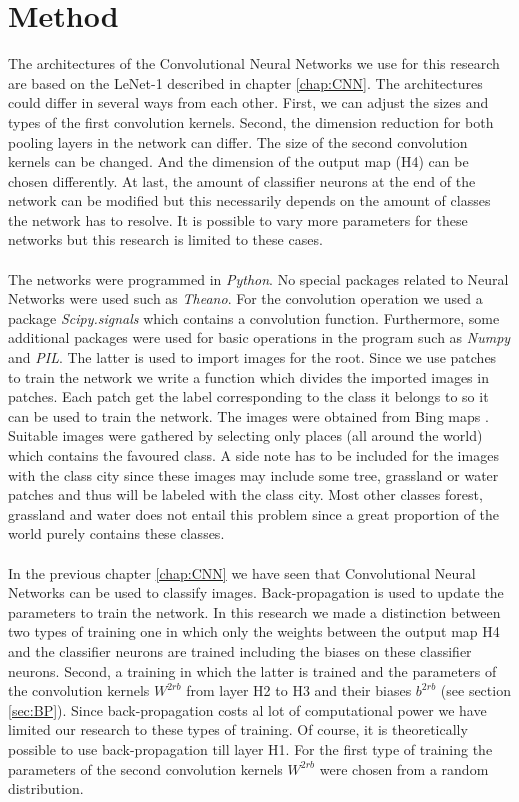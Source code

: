 \documentclass[a4paper,onecolumn]{report}
\begin{document}
\chapter{Method}
\label{chap:method}
The architectures of the Convolutional Neural Networks we use for this research are based on the LeNet-1 described in chapter \ref{chap:CNN}. The architectures could differ in several ways from each other. First, we can adjust the sizes and types of the first convolution kernels. Second, the dimension reduction for both pooling layers in the network can differ. The size of the second convolution kernels can be changed. And the dimension of the output map (H4) can be chosen differently. At last, the amount of classifier neurons at the end of the network can be modified but this necessarily depends on the amount of classes the network has to resolve.  It is possible to vary more parameters for these networks but this research is limited to these cases.
\\\\
The networks were programmed in \textit{Python}. No special packages related to Neural Networks were used such as \textit{Theano}. For the convolution operation we used a package \textit{Scipy.signals} which contains a convolution function. Furthermore, some additional packages were used for basic operations in the program such as \textit{Numpy} and \textit{PIL}. The latter is used to import images for the root. Since we use patches to train the network we write a function which divides the imported images in patches. Each patch get the label corresponding to the class it belongs to so it can be used to train the network. The images were obtained from Bing maps \cite{bing}. Suitable images were gathered by selecting only places (all around the world) which contains the favoured class. A side note has to be included for the images with the class city since these images may include some tree, grassland or water patches and thus will be labeled with the class city. Most other classes forest, grassland and water does not entail this problem since a great proportion of the world purely contains these classes.
\\\\
In the previous chapter \ref{chap:CNN} we have seen that Convolutional Neural Networks can be used to classify images. Back-propagation is used to update the parameters to train the network. In this research we made a distinction between two types of training one in which only the weights between the output map H4 and the classifier neurons are trained including the biases on these classifier neurons. Second, a training in which the latter is trained and the parameters of the convolution kernels $W^{2rb}$ from layer H2 to H3 and their biases $b^{2rb}$ (see section \ref{sec:BP}). Since back-propagation costs al lot of computational power we have limited our research to these types of training. Of course, it is theoretically possible to use back-propagation till layer H1. For the first type of training the parameters of the second convolution kernels  $W^{2rb}$ were chosen from a random distribution. 
\end{document}
